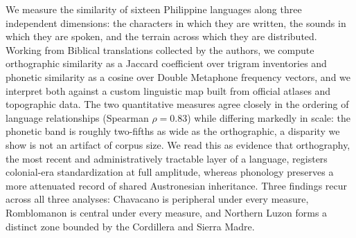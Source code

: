 We measure the similarity of sixteen Philippine languages along three
independent dimensions: the characters in which they are written, the sounds in
which they are spoken, and the terrain across which they are distributed.
Working from Biblical translations collected by the authors, we compute
orthographic similarity as a Jaccard coefficient over trigram inventories and
phonetic similarity as a cosine over Double Metaphone frequency vectors, and we
interpret both against a custom linguistic map built from official atlases and
topographic data. The two quantitative measures agree closely in the ordering of
language relationships (Spearman \( \rho = 0.83 \)) while differing markedly in
scale: the phonetic band is roughly two-fifths as wide as the orthographic, a
disparity we show is not an artifact of corpus size. We read this as evidence
that orthography, the most recent and administratively tractable layer of a
language, registers colonial-era standardization at full amplitude, whereas
phonology preserves a more attenuated record of shared Austronesian inheritance.
Three findings recur across all three analyses: Chavacano is peripheral under
every measure, Romblomanon is central under every measure, and Northern Luzon
forms a distinct zone bounded by the Cordillera and Sierra Madre.
